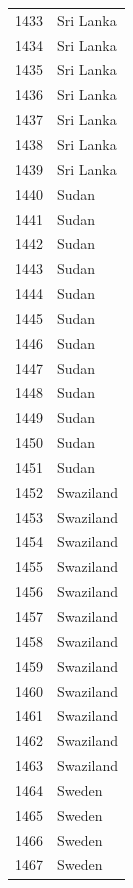 \documentclass[
  letterpaper,
  DIV=11,
  numbers=noendperiod]{scrreprt}
\begin{document}
\begin{tabular}{ll}
1433 &                 Sri Lanka \\
1434 &                 Sri Lanka \\
1435 &                 Sri Lanka \\
1436 &                 Sri Lanka \\
1437 &                 Sri Lanka \\
1438 &                 Sri Lanka \\
1439 &                 Sri Lanka \\
1440 &                     Sudan \\
1441 &                     Sudan \\
1442 &                     Sudan \\
1443 &                     Sudan \\
1444 &                     Sudan \\
1445 &                     Sudan \\
1446 &                     Sudan \\
1447 &                     Sudan \\
1448 &                     Sudan \\
1449 &                     Sudan \\
1450 &                     Sudan \\
1451 &                     Sudan \\
1452 &                 Swaziland \\
1453 &                 Swaziland \\
1454 &                 Swaziland \\
1455 &                 Swaziland \\
1456 &                 Swaziland \\
1457 &                 Swaziland \\
1458 &                 Swaziland \\
1459 &                 Swaziland \\
1460 &                 Swaziland \\
1461 &                 Swaziland \\
1462 &                 Swaziland \\
1463 &                 Swaziland \\
1464 &                    Sweden \\
1465 &                    Sweden \\
1466 &                    Sweden \\
1467 &                    Sweden \\

\end{tabular}
\end{document}
